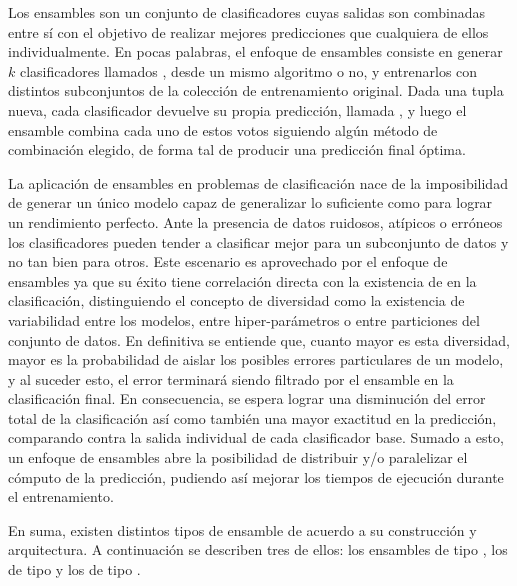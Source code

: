 Los ensambles son un conjunto de clasificadores cuyas salidas son combinadas
entre sí con el objetivo de realizar mejores predicciones que cualquiera de
ellos individualmente. En pocas palabras, el enfoque de ensambles consiste en
generar $k$ clasificadores llamados , desde un
mismo algoritmo o no, y entrenarlos con distintos subconjuntos de la colección
de entrenamiento original. Dada una tupla nueva, cada clasificador devuelve su
propia predicción, llamada , y luego el ensamble combina cada uno
de estos votos siguiendo algún método de combinación elegido, de forma tal de
producir una predicción final óptima.

La aplicación de ensambles en problemas de clasificación nace de la
imposibilidad de generar un único modelo capaz de generalizar lo suficiente como
para lograr un rendimiento perfecto. Ante la presencia de datos ruidosos,
atípicos o erróneos los clasificadores pueden tender a clasificar mejor para un
subconjunto de datos y no tan bien para otros. Este escenario es aprovechado por
el enfoque de ensambles ya que su éxito tiene correlación directa con la
existencia de  en la clasificación, distinguiendo el
concepto de diversidad como la existencia de variabilidad entre los modelos,
entre hiper-parámetros o entre particiones del conjunto de datos. En definitiva
se entiende que, cuanto mayor es esta diversidad, mayor es la probabilidad de
aislar los posibles errores particulares de un modelo, y al suceder esto, el
error terminará siendo filtrado por el ensamble en la clasificación final. En
consecuencia, se espera lograr una disminución del error total de la
clasificación así como también una mayor exactitud en la predicción, comparando
contra la salida individual de cada clasificador base. Sumado a esto, un
enfoque de ensambles abre la posibilidad de distribuir y/o paralelizar el
cómputo de la predicción, pudiendo así mejorar los tiempos de ejecución durante
el entrenamiento.

En suma, existen distintos tipos de ensamble de acuerdo a su construcción y
arquitectura. A continuación se describen tres de ellos: los ensambles de tipo
, los de tipo  y los de
tipo .

